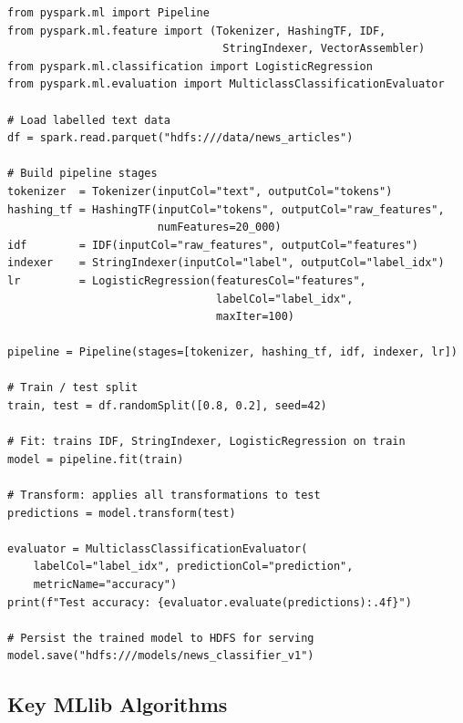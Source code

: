 \begin{lstlisting}[style=pyspark, caption={MLlib Pipeline for text classification}]
from pyspark.ml import Pipeline
from pyspark.ml.feature import (Tokenizer, HashingTF, IDF,
                                 StringIndexer, VectorAssembler)
from pyspark.ml.classification import LogisticRegression
from pyspark.ml.evaluation import MulticlassClassificationEvaluator

# Load labelled text data
df = spark.read.parquet("hdfs:///data/news_articles")

# Build pipeline stages
tokenizer  = Tokenizer(inputCol="text", outputCol="tokens")
hashing_tf = HashingTF(inputCol="tokens", outputCol="raw_features",
                       numFeatures=20_000)
idf        = IDF(inputCol="raw_features", outputCol="features")
indexer    = StringIndexer(inputCol="label", outputCol="label_idx")
lr         = LogisticRegression(featuresCol="features",
                                labelCol="label_idx",
                                maxIter=100)

pipeline = Pipeline(stages=[tokenizer, hashing_tf, idf, indexer, lr])

# Train / test split
train, test = df.randomSplit([0.8, 0.2], seed=42)

# Fit: trains IDF, StringIndexer, LogisticRegression on train
model = pipeline.fit(train)

# Transform: applies all transformations to test
predictions = model.transform(test)

evaluator = MulticlassClassificationEvaluator(
    labelCol="label_idx", predictionCol="prediction",
    metricName="accuracy")
print(f"Test accuracy: {evaluator.evaluate(predictions):.4f}")

# Persist the trained model to HDFS for serving
model.save("hdfs:///models/news_classifier_v1")
\end{lstlisting}

\subsection{Key MLlib Algorithms}
\label{subsec:mllib-algos}

